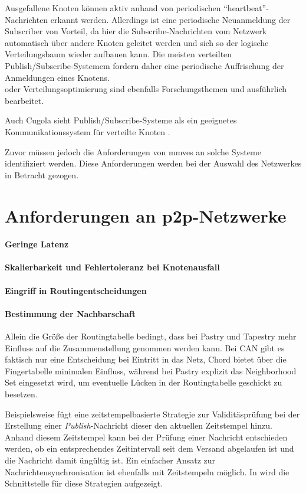 Ausgefallene Knoten können aktiv anhand von periodischen \enquote{heartbeat}-Nachrichten erkannt werden. Allerdings ist eine periodische Neuanmeldung der Subscriber von Vorteil, da hier die Subscribe-Nachrichten vom Netzwerk automatisch über andere Knoten geleitet werden und sich so der logische Verteilungsbaum wieder aufbauen kann. Die meisten verteilten Publish/Subscribe-Systemem fordern daher eine periodische Auffrischung der Anmeldungen eines Knotens.\\

oder Verteilungsoptimierung \cite{Muhl2002LargeScale} sind ebenfalls Forschungsthemen und ausführlich bearbeitet.

Auch Cugola sieht Publish/Subscribe-Systeme als ein geeignetes Kommunikationssystem für verteilte Knoten \cite{Cugola2002Using}.


Zuvor müssen jedoch die Anforderungen von \acp{mmve} an solche Systeme identifiziert werden. Diese Anforderungen werden bei der Auswahl des Netzwerkes in Betracht gezogen.

\section{Anforderungen an p2p-Netzwerke}

\paragraph{Geringe Latenz} 

\paragraph{Skalierbarkeit und Fehlertoleranz bei Knotenausfall} 

\paragraph{Eingriff in Routingentscheidungen} 

\paragraph{Bestimmung der Nachbarschaft}
Allein die Größe der Routingtabelle bedingt, dass bei Pastry und Tapestry mehr Einfluss auf die Zusammenstellung genommen werden kann. Bei CAN gibt es faktisch nur eine Entscheidung bei Eintritt in das Netz, Chord bietet über die Fingertabelle minimalen Einfluss, während bei Pastry explizit das Neighborhood Set eingesetzt wird, um eventuelle Lücken in der Routingtabelle geschickt zu besetzen.


Beispielsweise fügt eine zeitstempelbasierte Strategie zur Validitäsprüfung bei der Erstellung einer \emph{Publish}-Nachricht dieser den aktuellen Zeitstempel hinzu. Anhand diesem Zeitstempel kann bei der Prüfung einer Nachricht entschieden werden, ob ein entsprechendes Zeitintervall seit dem Versand abgelaufen ist und die Nachricht damit üngültig ist. Ein einfacher Ansatz zur Nachrichtensynchronisation ist ebenfalls mit Zeitstempeln möglich. In  wird die Schnittstelle für diese Strategien aufgezeigt.

